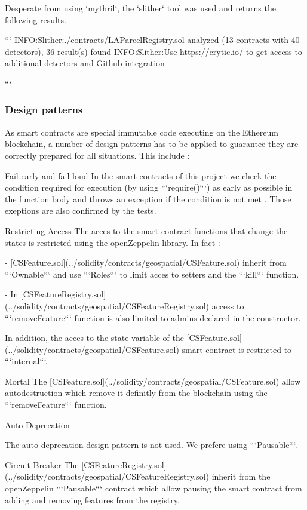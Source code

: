\documentclass{isprs} %
\begin{document}
Desperate from using `mythril`, the `slither` tool was used and returns the following results.

```
INFO:Slither:./contracts/LAParcelRegistry.sol analyzed (13 contracts with 40 detectors), 36 result(s) found
INFO:Slither:Use https://crytic.io/ to get access to additional detectors and Github integration

```

\subsubsection{Design patterns}\label{sec:Design patterns}

As smart contracts are special immutable code executing on the Ethereum blockchain, a number of design patterns has to be applied to guarantee they are correctly prepared for all situations. This include :


Fail early and fail loud
In the smart contracts of this project we check the condition required for execution (by using  ```require()```) as early as possible in the function body and throws an exception if the condition is not met . Those exeptions are also confirmed by the tests. 

Restricting Access
The acces to the smart contract functions that change the states is restricted using the openZeppelin library. In fact :

- [CSFeature.sol](../solidity/contracts/geospatial/CSFeature.sol) inherit from ```Ownable``` and use ```Roles``` to limit acces to setters and the ```kill``` function.

- In [CSFeatureRegistry.sol](../solidity/contracts/geospatial/CSFeatureRegistry.sol) access to ```removeFeature``` function is also limited to admins declared in the constructor. 

In addition, the acces to the state variable of the [CSFeature.sol](../solidity/contracts/geospatial/CSFeature.sol) smart contract is restricted to ```internal```.

Mortal
The [CSFeature.sol](../solidity/contracts/geospatial/CSFeature.sol) allow autodestruction which remove it definitly from the blockchain using the  ```removeFeature``` function.

Auto Deprecation

The auto deprecation design pattern is not used. We prefere using ```Pausable```. 

Circuit Breaker
The [CSFeatureRegistry.sol](../solidity/contracts/geospatial/CSFeatureRegistry.sol) inherit from the openZeppelin ```Pausable``` contract which allow pausing the smart contract from adding and removing features from the registry.  
\end{document}
